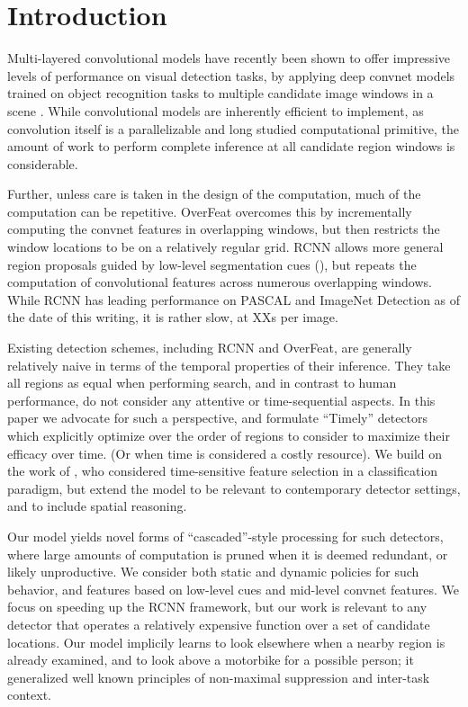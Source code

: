 \section{Introduction}\label{introduction}

Multi-layered convolutional models have recently been shown to offer impressive levels of performance on visual detection tasks, by applying deep convnet models trained on object recognition tasks to multiple candidate image windows in a scene \cite{Sermanet-ICLR-2014,Girshick-CVPR-2014}.
While convolutional models are inherently efficient to implement, as convolution itself is a parallelizable and long studied computational primitive, the amount of work to perform complete inference at all candidate region windows is considerable.

Further, unless care is taken in the design of the computation, much of the computation can be repetitive.
OverFeat \cite{Sermanet-ICLR-2014} overcomes this by incrementally computing the convnet features in overlapping windows, but then restricts the window locations to be on a relatively regular grid. RCNN allows more general region proposals guided by low-level segmentation cues (\cite{Uijlings-IJCV-2013}), but repeats the computation of convolutional features across numerous overlapping windows.
While RCNN has leading performance on PASCAL and ImageNet Detection as of the date of this writing, it is rather slow, at XXs per image.

Existing detection schemes, including RCNN and OverFeat, are generally relatively naive in terms of the temporal properties of their inference.
They take all regions as equal when performing search, and in contrast to human performance, do not consider any attentive or time-sequential aspects.
In this paper we advocate for such a perspective, and formulate ``Timely'' detectors which explicitly optimize over the order of regions to consider to maximize their efficacy over time.
(Or when time is considered a costly resource).
We build on the work of \cite{Karayev-NIPS-2012}, who considered time-sensitive feature selection in a classification paradigm, but extend the model to be relevant to contemporary detector settings, and to include spatial reasoning.

Our model yields novel forms of ``cascaded''-style processing for such detectors, where large amounts of computation is pruned when it is deemed redundant, or likely unproductive.
We consider both static and dynamic policies for such behavior, and features based on low-level cues and mid-level convnet features.
We focus on speeding up the RCNN framework, but our work is relevant to any detector that operates a relatively expensive function over a set of candidate locations.
Our model implicily learns to look elsewhere when a nearby region is already examined, and to look above a motorbike for a possible person; it generalized well known principles of non-maximal suppression and inter-task context.

